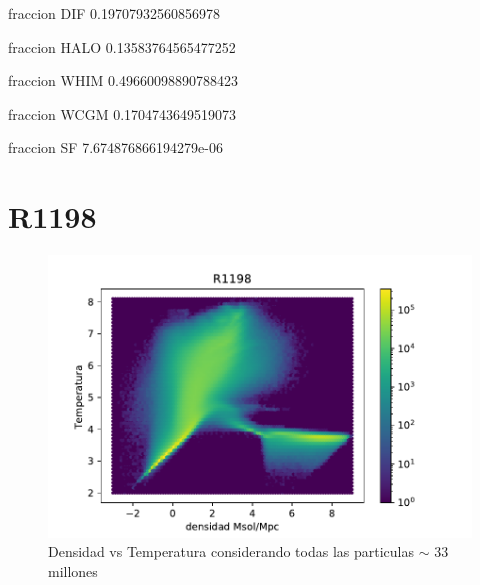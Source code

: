 fraccion DIF 0.19707932560856978

fraccion HALO 0.13583764565477252

fraccion WHIM 0.49660098890788423

fraccion WCGM 0.1704743649519073

fraccion SF 7.674876866194279e-06
\label{Chapter2} %



\section{R1198}

\begin{figure}[h]
\centering
\includegraphics[width=18cm]{Figures/R1198_diagfase.pdf}
\decoRule
\caption[Diagrama de Fase TODAS particulas]{Densidad vs Temperatura considerando todas las particulas $\sim$ 33 millones}
\label{fig:Electron}
\end{figure}

